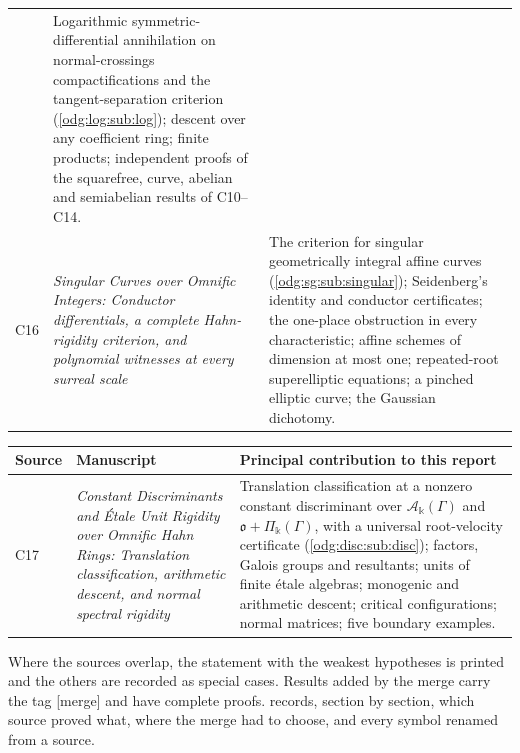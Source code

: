 \documentclass[11pt,oneside]{article}
\numberwithin{equation}{section}
\theoremstyle{definition}
\theoremstyle{remark}
\newcommand{\mergetag}{\textup{\textsf{\small[merge]}}}
\newcommand{\crA}{\mathcal A_\Bbbk(\Gamma)}
\newcommand{\crP}{\Pi_\Bbbk(\Gamma)}
\begin{document}
\begin{center}
\begin{tabular}{>{\raggedright\arraybackslash}p{}>{\raggedright\arraybackslash}p{}>{\raggedright\arraybackslash}p{}}
{varieties, and logarithmic differential certificates} &
Logarithmic symmetric-differential annihilation on normal-crossings compactifications
and the tangent-separation criterion (\cref{odg:log:sub:log}); descent over any
coefficient ring; finite products; independent proofs of the squarefree, curve, abelian
and semiabelian results of C10--C14.\\
C16 & \emph{Singular Curves over Omnific Integers: Conductor differentials, a complete
Hahn-rigidity criterion, and polynomial witnesses at every surreal scale} &
The criterion for singular geometrically integral affine curves
(\cref{odg:sg:sub:singular}); Seidenberg's identity and conductor certificates; the
one-place obstruction in every characteristic; affine schemes of dimension at most one;
repeated-root superelliptic equations; a pinched elliptic curve; the Gaussian dichotomy.\\
\bottomrule
\end{tabular}
\end{center}

\begin{center}
\renewcommand{\arraystretch}{1.2}
\begin{tabular}{>{\raggedright\arraybackslash}p{}>{\raggedright\arraybackslash}p{}>{\raggedright\arraybackslash}p{}}
\toprule
Source & Manuscript & Principal contribution to this report\\
\midrule
C17 & \emph{Constant Discriminants and \'Etale Unit Rigidity over Omnific Hahn Rings:
Translation classification, arithmetic descent, and normal spectral rigidity} &
Translation classification at a nonzero constant discriminant over $\crA$ and
$\mathfrak o+\crP$, with a universal root-velocity certificate
(\cref{odg:disc:sub:disc}); factors, Galois groups and resultants; units of finite
\'etale algebras; monogenic and arithmetic descent; critical configurations; normal
matrices; five boundary examples.\\
\bottomrule
\end{tabular}
\end{center}

Where the sources overlap, the statement with the weakest hypotheses is
printed and the others are recorded as special cases. Results added by the
merge carry the tag \mergetag{} and have complete proofs.
 records, section by section, which source proved what,
where the merge had to choose, and every symbol renamed from a source.
\end{document}
